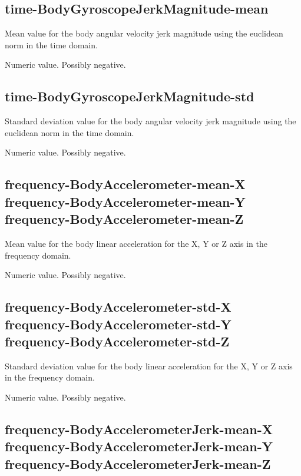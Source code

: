 \documentclass[a4paper,10pt]{report}
\begin{document}
\subsection*{time-BodyGyroscopeJerkMagnitude-mean} 

Mean value for the body angular velocity jerk magnitude using the euclidean norm in the time domain.

Numeric value. Possibly negative.

\subsection*{time-BodyGyroscopeJerkMagnitude-std} 

Standard deviation value for the body angular velocity jerk magnitude using the euclidean norm in the time domain.

Numeric value. Possibly negative.

\subsection*{frequency-BodyAccelerometer-mean-X\\frequency-BodyAccelerometer-mean-Y\\frequency-BodyAccelerometer-mean-Z} 

Mean value for the body linear acceleration for the X, Y or Z axis in the frequency domain.

Numeric value. Possibly negative.

\subsection*{frequency-BodyAccelerometer-std-X\\frequency-BodyAccelerometer-std-Y\\frequency-BodyAccelerometer-std-Z} 

Standard deviation value for the body linear acceleration for the X, Y or Z axis in the frequency domain.

Numeric value. Possibly negative.

\subsection*{frequency-BodyAccelerometerJerk-mean-X\\frequency-BodyAccelerometerJerk-mean-Y\\frequency-BodyAccelerometerJerk-mean-Z} 
\end{document}

